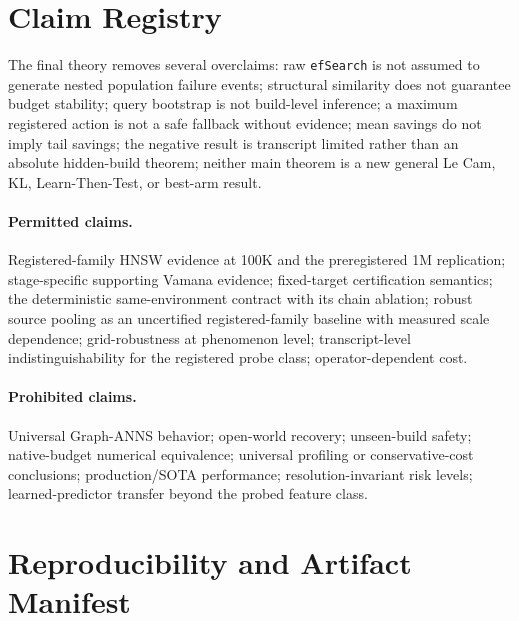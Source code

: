 \documentclass{article}
\begin{document}
\section{Claim Registry}
\label{app:claims}

The final theory removes several overclaims: raw \texttt{efSearch} is not assumed to generate nested
population failure events; structural similarity does not guarantee budget stability; query bootstrap is
not build-level inference; a maximum registered action is not a safe fallback without evidence; mean
savings do not imply tail savings; the negative result is transcript limited rather than an absolute
hidden-build theorem; neither main theorem is a new general Le Cam, KL, Learn-Then-Test, or best-arm
result.

\paragraph{Permitted claims.}
Registered-family HNSW evidence at 100K and the preregistered 1M replication; stage-specific supporting
Vamana evidence; fixed-target certification semantics; the deterministic same-environment contract with its
chain ablation; robust source pooling as an uncertified registered-family baseline with measured scale
dependence; grid-robustness at phenomenon level; transcript-level indistinguishability for the registered
probe class; operator-dependent cost.

\paragraph{Prohibited claims.}
Universal Graph-ANNS behavior; open-world recovery; unseen-build safety; native-budget numerical
equivalence; universal profiling or conservative-cost conclusions; production/SOTA performance;
resolution-invariant risk levels; learned-predictor transfer beyond the probed feature class.

\section{Reproducibility and Artifact Manifest}
\label{app:repro}
\end{document}

